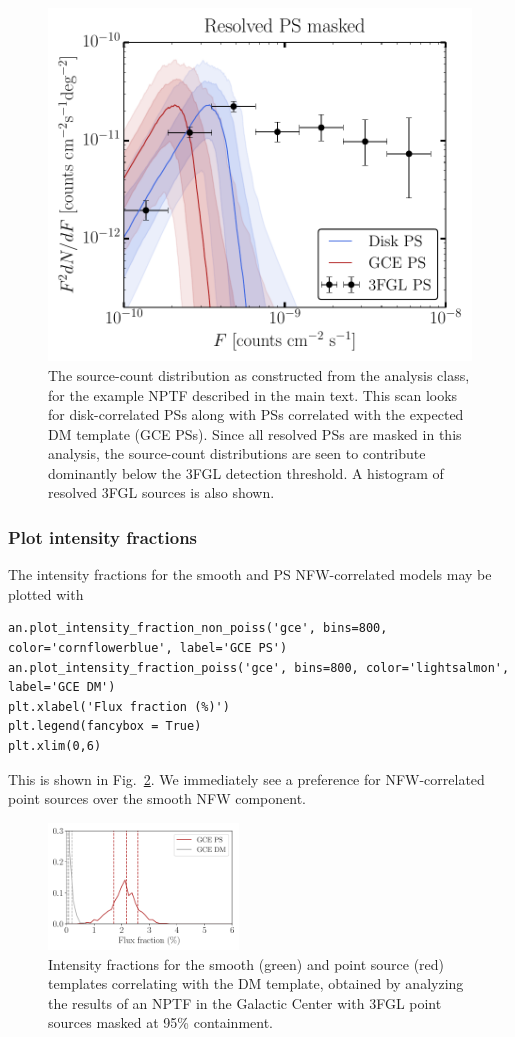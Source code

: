 \begin{figure}[htb]
\leavevmode
\begin{center}
\includegraphics[width=.49\textwidth]{ch-nptfit/dnds_masked.pdf}
\end{center}
\vspace{-.50cm}
\caption{The source-count distribution as constructed from the analysis class, for the example NPTF described in the main text.  This scan looks for  disk-correlated PSs along with PSs correlated with the expected DM template (GCE PSs).  Since all resolved PSs are masked in this analysis, the source-count distributions are seen to contribute dominantly below the 3FGL detection threshold.  A histogram of resolved 3FGL sources is also shown.}
\label{fig:gc_dndf}
\end{figure} 

\subsubsection{Plot intensity fractions}

The intensity fractions for the smooth and PS NFW-correlated models may be plotted with

\begin{lstlisting}
an.plot_intensity_fraction_non_poiss('gce', bins=800, color='cornflowerblue', label='GCE PS')
an.plot_intensity_fraction_poiss('gce', bins=800, color='lightsalmon', label='GCE DM')
plt.xlabel('Flux fraction (%)')
plt.legend(fancybox = True)
plt.xlim(0,6)
\end{lstlisting}

This is shown in Fig.~\ref{fig:gc_intensity}. We immediately see a preference for NFW-correlated point sources over the smooth NFW component.

\begin{figure}[htbp]
\centering
\includegraphics[width=0.45\textwidth]{ch-nptfit/gce_intensity_fraction.pdf} 
\caption{Intensity fractions for the smooth (green) and point source (red) templates correlating with the DM template, obtained by analyzing the results of an NPTF in the Galactic Center with 3FGL point sources masked at 95\% containment.}
\label{fig:gc_intensity}
\end{figure}

